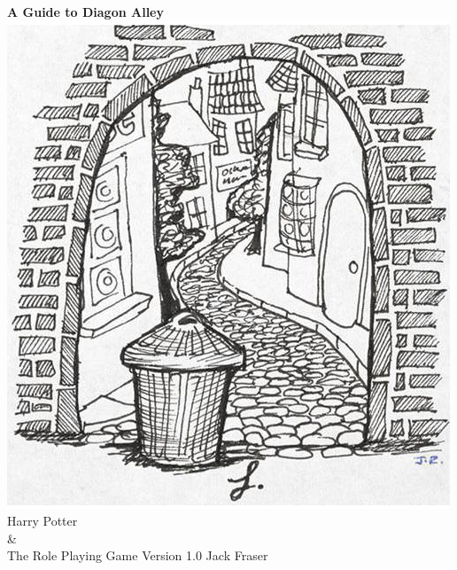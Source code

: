 \documentclass[oneside, twocolumn, 9pt, english]{extbook}
\begin{document}
\begin{titlepage}

    \centering
    \vfill
    {\bfseries
        {\HP \fontsize{40}{35}\selectfont A Guide to Diagon Alley}
    }    
    \vfill
    \includegraphics[scale = 0.6]{../../Images/alley} %
    \vfill
    {\HP \fontsize{30}{24} \selectfont  Harry Potter \\\&\\ The Role Playing Game}
    \normalsize
    \vfill
    {\HP \fontsize{22}{0} \selectfont Version 1.0 \hfill Jack Fraser}
\end{titlepage}



	\renewcommand\arraystretch{1.5}
\newcommand\basicPerson[2]
{
	\textbf{\textit{#1}}
	
	#2

}

\newcommand\shop[7]
{
	\subsection{#1 (\it #4)}
	
	\begin{supertabular}{@{} r p{6.5  cm} @{}}
		\bf Location:	&	#2
		\\
		\bf Exterior: &		#5
		\\
		\bf Interior:	&	#6
		\\
		\bf Proprietor:	&	#3
		\\
		\bf Inventory:	&	\parbox[t]{6.5cm}{#7}
		\\
	\end{supertabular}
	~
	\\
}
\end{document}
